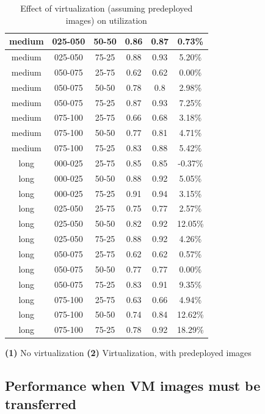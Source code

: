 \begin{table}
\begin{center}
\begin{tabular}{|c|c|c|c|c|c|}
\\\hline
medium & 025-050 & 50-50 & 0.86 & 0.87 & 0.73\%
\\\hline
medium & 025-050 & 75-25 & 0.88 & 0.93 & 5.20\%
\\\hline
medium & 050-075 & 25-75 & 0.62 & 0.62 & 0.00\%
\\\hline
medium & 050-075 & 50-50 & 0.78 & 0.8 & 2.98\%
\\\hline
medium & 050-075 & 75-25 & 0.87 & 0.93 & 7.25\%
\\\hline
medium & 075-100 & 25-75 & 0.66 & 0.68 & 3.18\%
\\\hline
medium & 075-100 & 50-50 & 0.77 & 0.81 & 4.71\%
\\\hline
medium & 075-100 & 75-25 & 0.83 & 0.88 & 5.42\%
\\\hline
long & 000-025 & 25-75 & 0.85 & 0.85 & -0.37\%
\\\hline
long & 000-025 & 50-50 & 0.88 & 0.92 & 5.05\%
\\\hline
long & 000-025 & 75-25 & 0.91 & 0.94 & 3.15\%
\\\hline
long & 025-050 & 25-75 & 0.75 & 0.77 & 2.57\%
\\\hline
long & 025-050 & 50-50 & 0.82 & 0.92 & 12.05\%
\\\hline
long & 025-050 & 75-25 & 0.88 & 0.92 & 4.26\%
\\\hline
long & 050-075 & 25-75 & 0.62 & 0.62 & 0.57\%
\\\hline
long & 050-075 & 50-50 & 0.77 & 0.77 & 0.00\%
\\\hline
long & 050-075 & 75-25 & 0.83 & 0.91 & 9.35\%
\\\hline
long & 075-100 & 25-75 & 0.63 & 0.66 & 4.94\%
\\\hline
long & 075-100 & 50-50 & 0.74 & 0.84 & 12.62\%
\\\hline
long & 075-100 & 75-25 & 0.78 & 0.92 & 18.29\%
\\\hline
\end{tabular}

\textbf{(1)} No virtualization 
\textbf{(2)} Virtualization, with predeployed images
\caption{Effect of virtualization (assuming predeployed images) on utilization}
\label{tab:noVMvsPredeployUtil}
\end{center}
\end{table}

\subsection{Performance when VM images must be transferred}

